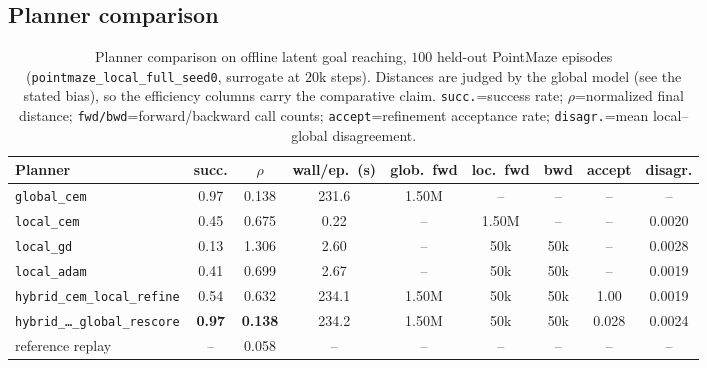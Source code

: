 \documentclass[11pt,a4paper]{article}
\begin{document}
\subsection{Planner comparison}
\begin{table}[h]
\centering
\scriptsize
\setlength{\tabcolsep}{4pt}
\begin{tabular}{@{}lcccccccc@{}}
\toprule
Planner & succ. & $\rho$ & wall/ep.\ (s) & glob.\ fwd & loc.\ fwd & bwd & accept & disagr. \\
\midrule
\texttt{global\_cem}                     & 0.97 & 0.138 & 231.6 & 1.50M & --    & --    & --    & --     \\
\texttt{local\_cem}                      & 0.45 & 0.675 & 0.22  & --    & 1.50M & --    & --    & 0.0020 \\
\texttt{local\_gd}                       & 0.13 & 1.306 & 2.60  & --    & 50k   & 50k   & --    & 0.0028 \\
\texttt{local\_adam}                     & 0.41 & 0.699 & 2.67  & --    & 50k   & 50k   & --    & 0.0019 \\
\texttt{hybrid\_cem\_local\_refine}      & 0.54 & 0.632 & 234.1 & 1.50M & 50k   & 50k   & 1.00  & 0.0019 \\
\texttt{hybrid\_\dots\_global\_rescore}  & \textbf{0.97} & \textbf{0.138} & 234.2 & 1.50M & 50k & 50k & 0.028 & 0.0024 \\
\midrule
reference replay                         & --   & 0.058 & --    & --    & --    & --    & --    & --     \\
\bottomrule
\end{tabular}
\caption{Planner comparison on offline latent goal reaching, $100$ held-out
PointMaze episodes (\texttt{pointmaze\_local\_full\_seed0}, surrogate at
$20$k steps). Distances are judged by the global model (see the stated bias),
so the efficiency columns carry the comparative claim. \texttt{succ.}=success
rate; $\rho$=normalized final distance; \texttt{fwd/bwd}=forward/backward call
counts; \texttt{accept}=refinement acceptance rate;
\texttt{disagr.}=mean local--global disagreement.}
\label{tab:lg-planners}
\end{table}
\end{document}
